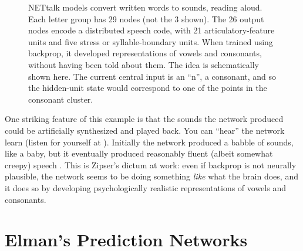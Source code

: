 
\begin{figure}[htbp]
\centering
{}
\caption[Pamela Payne and Jeff Yoshimi.]{NETtalk models convert written words to sounds, \ie reading aloud. Each letter group has 29 nodes (not the 3 shown). The 26 output nodes encode a distributed speech code, with 21 articulatory-feature units and five stress or syllable-boundary units. When trained using backprop, it developed representations of vowels and consonants, without having been told about them. The idea is schematically shown here. The current central input is an ``n'', a consonant, and so the hidden-unit state would correspond to one of the points in the consonant cluster.}
\label{net_talk}
\end{figure}

One striking feature of this example is that the sounds the network produced could be artificially synthesized and played back. You can ``hear'' the network learn (listen for yourself at ). Initially the network produced a babble of sounds, like a baby, but it eventually produced reasonably fluent (albeit somewhat creepy) speech \cite{sejnowski1987parallel}. This is Zipser's dictum at work: even if backprop is not neurally plausible, the network seems to be doing something \emph{like} what the brain does, and it does so by developing psychologically realistic representations of vowels and consonants.

\section{Elman's Prediction Networks}


